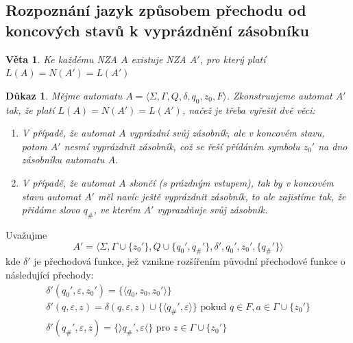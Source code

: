 \documentclass[10pt, a4paper, titlepage]{article}
\theoremstyle{note}
\newtheorem{veta}{Věta}
\newtheorem{dukaz}{Důkaz}
\begin{document}
\subsection{Rozpoznání jazyk způsobem přechodu od koncových stavů k vyprázdnění zásobníku}
\begin{veta}
Ke každému NZA $A$ existuje NZA $A'$, pro který platí $L(A) = N(A') = L(A')$
\end{veta}
\begin{dukaz}
Mějme automatu $A = \langle \Sigma, \Gamma, Q, \delta, q_0, z_0, F \rangle$. Zkonstruujeme automat $A'$ tak, že
platí $L(A) = N(A') = L(A')$, načež je třeba vyřešit dvě věci:
\begin{enumerate}
\item
V případě, že automat $A$ vyprázdní svůj zásobník, ale v koncovém stavu, potom $A'$ nesmí vyprázdnit zásobník, což se řeší
přídáním symbolu $z_0'$ na dno zásobníku automatu $A$.

\item
V případě, že automat $A$ skončí (s prázdným vstupem), tak by v koncovém stavu automat $A'$ měl navíc ještě vyprázdnit
zásobník, to ale zajistíme tak, že přidáme slovo $q_\#$, ve kterém $A'$ vyprazdňuje svůj zásobník.
\end{enumerate} 
\end{dukaz}

Uvažujme
$$
A' = \langle \Sigma, \Gamma \cup \lbrace z_{0}' \rbrace, Q \cup \lbrace q_{0}', q_{\#}' \rbrace, \delta',
q_0', z_0', \lbrace q_{\#}' \rbrace \rangle
$$
kde $\delta'$ je přechodová funkce, jež vznikne rozšířením původní přechodové funkce o následující přechody:
\begin{gather*}
\delta'(q_0', \varepsilon, z_0') = \lbrace \langle q_0, z_0, z_0' \rangle \rbrace \\
\delta'(q, \varepsilon, z) = \delta(q, \varepsilon, z) \cup \lbrace \langle q_{\#}', \varepsilon \rangle \rbrace \text { pokud }
q \in F, a \in \Gamma \cup \lbrace z_0' \rbrace \\
\delta'(q_{\#}', \varepsilon, z) = \lbrace \rangle q_{\#}', \varepsilon \langle \rbrace \text{ pro } z \in \Gamma \cup \lbrace z_0' \rbrace
\end{gather*}
\end{document}
